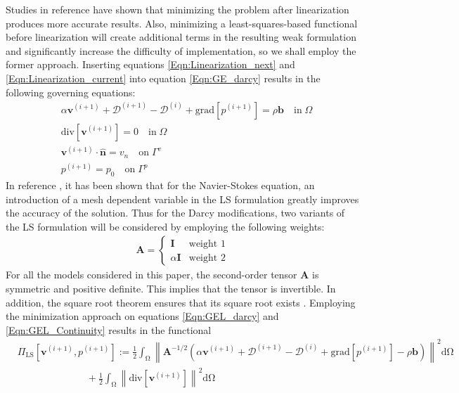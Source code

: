 \documentclass[11pt,reqno]{amsart}
\begin{document}
Studies in reference \cite{Linearization_Payette} have 
shown that minimizing the problem after linearization 
produces more accurate results. Also, minimizing a 
least-squares-based functional before linearization will 
create additional terms in the resulting weak 
formulation and significantly increase the difficulty of 
implementation, so we shall employ the former approach. Inserting 
equations \eqref{Eqn:Linearization_next} and 
\eqref{Eqn:Linearization_current} into equation 
\eqref{Eqn:GE_darcy} results in the following governing 
equations:
\begin{subequations}
  \label{Eqn:governing_equations_linearized}
  \begin{align}
    \label{Eqn:GEL_darcy}
    &\alpha\mathbf{v}^{(i+1)} + \mathcal{D}^{(i+1)}- \mathcal{D}^{(i)} +\mathrm{grad}[p^{(i+1)}] = \rho\mathbf{b}
    \quad \mathrm{in} \; \Omega \\
    \label{Eqn:GEL_Continuity}
    &\mathrm{div}[\mathbf{v}^{(i+1)}] = 0 \quad \mathrm{in} \; \Omega \\
    &\mathbf{v}^{(i+1)} \cdot \mathbf{\hat{n}} = v_n \quad \mathrm{on} \; \Gamma^{v} \\
    &p^{(i+1)} = p_0 \quad \mathrm{on} \; \Gamma^{p}
  \end{align}
\end{subequations}
In reference \cite{LS_issues}, it has been shown that for the Navier-Stokes equation, 
an introduction of a mesh dependent variable in the LS formulation 
greatly improves the accuracy of the solution. Thus for the Darcy modifications, 
two variants of the LS formulation will be 
considered by employing the following weights:
\begin{align}
  \mathbf{A} = 
  \left\{\begin{array}{cl}
    \mathbf{I} & \mbox{weight 1} \\
    \alpha\mathbf{I}& \mbox{weight 2}
  \end{array}
  \right.
  \label{Eqn:GEL_weights}
\end{align}
For all the models considered in this paper, the 
second-order tensor $\mathbf{A}$ is symmetric and 
positive definite. This implies that the tensor is 
invertible. In addition, the square root theorem 
ensures that its square root exists \cite{Gurtin}. 
Employing the minimization approach on equations 
\eqref{Eqn:GEL_darcy} and \eqref{Eqn:GEL_Continuity} 
results in the functional
\begin{align}
  \label{Eqn:GEL_minimized}
  &\Pi_{\mathrm{LS}}[\mathbf{v}^{(i+1)},p^{(i+1)}] := \frac{1}{2}\int_{\mathrm{\Omega}}\left\|\mathbf{A}^{-1/2}(\alpha\mathbf{v}^{(i+1)}+\mathcal{D}^{(i+1)}- \mathcal{D}^{(i)}
	+ \mathrm{grad}[p^{(i+1)}]-\rho\mathbf{b})\right\|^2\mathrm{d\Omega} \nonumber \\
	& \qquad\qquad\qquad\quad + \frac{1}{2}\int_{\mathrm{\Omega}}
	\left\|\mathrm{div}[\mathbf{v}^{(i+1)}]\right\|^2\mathrm{d\Omega}
\end{align}
\end{document}
